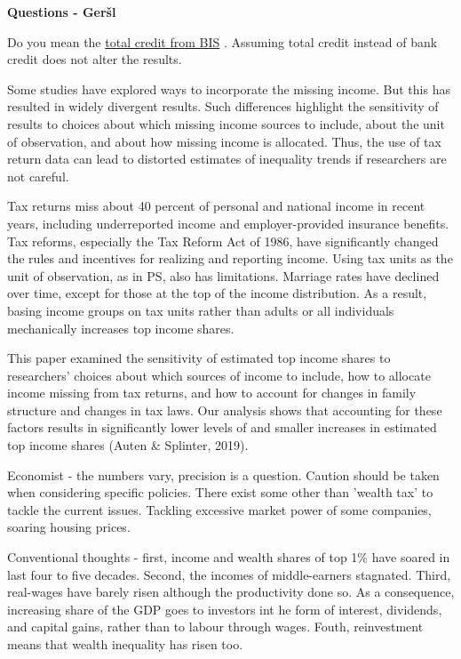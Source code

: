 \documentclass[a4paper,11pt]{article}
\begin{document}
\textbf{Questions - Geršl}

Do you mean the \href{https://stats.bis.org/statx/srs/table/f2.1}{total credit from BIS} . Assuming total credit instead of bank credit does not alter the results.

Some studies have explored ways to incorporate the missing income. But this has resulted in widely divergent results. Such differences highlight the sensitivity of results to choices about which missing income sources to include, about the unit of observation, and about how missing income is allocated. Thus, the use of tax return data can lead to distorted estimates of inequality trends if researchers are not careful. 

Tax returns miss about 40 percent of personal and national income in recent years, including underreported income and employer-provided insurance benefits. Tax reforms, especially the Tax Reform Act of 1986, have significantly changed the rules and incentives for realizing and reporting income. Using tax units as the unit of observation, as in PS, also has limitations. Marriage rates have declined over time, except for those at the top of the income distribution. As a result, basing income groups on tax units rather than adults or all individuals mechanically increases top income shares.

This paper examined the sensitivity of estimated top income shares to researchers’ choices about which sources of income to include, how to allocate income missing from tax returns, and how to account for changes in family structure and changes in tax laws. Our analysis shows that accounting for these factors results in significantly lower levels of and smaller increases in estimated top income shares (Auten \& Splinter, 2019).

Economist - the numbers vary, precision is a question. Caution should be taken when considering specific policies. There exist some other than 'wealth tax' to tackle the current issues. Tackling excessive market power of some companies, soaring housing prices.

Conventional thoughts - first, income and wealth shares of top 1\% have soared in last four to five decades. Second, the incomes of middle-earners stagnated. Third, real-wages have barely risen although the productivity done so. As a consequence, increasing share of the GDP goes to investors int he form of interest, dividends, and capital gains, rather than to labour through wages. Fouth, reinvestment means that wealth inequality has risen too.
\end{document}
